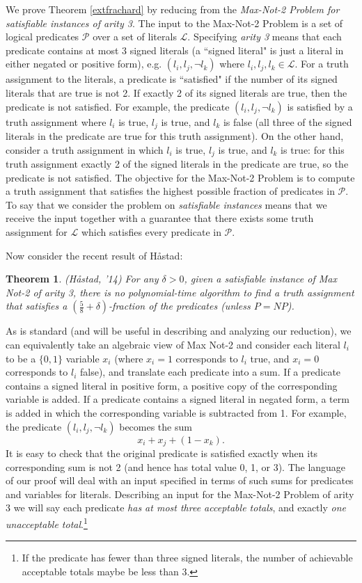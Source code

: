 \documentclass{article}
\newtheorem{theorem}{Theorem}[]
\begin{document}
We prove Theorem \ref{extfrachard} by reducing from the \textit{Max-Not-2 Problem for satisfiable instances of arity 3}. The input to the Max-Not-2 Problem is a set of logical predicates $\mathcal{P}$ over a set of literals $\mathcal{L}$. Specifying \textit{arity 3} means that each predicate contains at most 3 signed literals (a ``signed literal" is just a literal in either negated or positive form), e.g. $(l_i,l_j,\neg l_k)$ where $l_i, l_j,l_k\in \mathcal{L}$. For a truth assignment to the literals, a predicate is ``satisfied" if the number of its signed literals that are true is not 2. If exactly 2 of its signed literals are true, then the predicate is not satisfied. For example, the predicate $(l_i,l_j,\neg l_k)$ is satisfied by a truth assignment where $l_i$ is true, $l_j$ is true, and $l_k $ is false (all three of the signed literals in the predicate are true for this truth assignment). On the other hand, consider a truth assignment in which $l_i$ is true, $l_j$ is true, and $l_k$ is true: for this truth assignment exactly 2 of the signed literals in the predicate are true, so the predicate is not satisfied. The objective for the Max-Not-2 Problem is to compute a truth assignment that satisfies the highest possible fraction of predicates in $\mathcal{P}$. To say that we consider the problem on \textit{satisfiable instances} means that we receive the input together with a guarantee that there exists some truth assignment for $\mathcal{L}$ which satisfies every predicate in $\mathcal{P}$.

Now consider the recent result of H{\aa}stad:

\begin{theorem} \label{hastad}(H{\aa}stad, '14)
For any $\delta>0$, given a satisfiable instance of Max Not-2 of arity 3, there is no polynomial-time algorithm to find a truth assignment that satisfies a $(\frac{5}{8}+\delta)$-fraction of the predicates (unless $P=NP$). 
\end{theorem}

As is standard (and will be useful in describing and analyzing our reduction), we can equivalently take an algebraic view of Max Not-2 and consider each literal $l_i$ to be a $\{0,1\}$ variable $x_i$ (where $x_i=1$ corresponds to $l_i$ true, and $x_i=0$ corresponds to $l_i$ false), and translate each predicate into a sum.  If a predicate contains a signed literal in positive form, a positive copy of the corresponding variable is added. If a predicate contains a signed literal in negated form, a term is added in which the corresponding variable is subtracted from 1. For example, the predicate $(l_i,l_j,\neg l_k)$ becomes the sum
\[
x_i+x_j+(1-x_k).
\]
It is easy to check that the original predicate is satisfied exactly when its corresponding sum is not 2 (and hence has total value 0, 1, or 3). The language of our proof will deal with an input specified in terms of such sums for predicates and variables for literals. Describing an input for the Max-Not-2 Problem of arity 3 we will say each predicate \textit{has at most three acceptable totals}, and exactly \textit{one unacceptable total}.\footnote{If the predicate has fewer than three signed literals, the number of achievable acceptable totals maybe be less than 3.}
\end{document}
